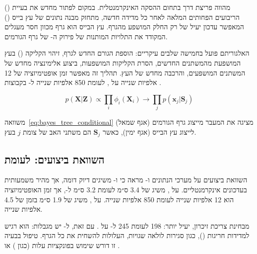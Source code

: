  ()
מהווה פריצת דרך בתחום ההסקה האינקרמנטלית. במקום לפתור מחדש את
בעיית הריבועים הפחותים המלאה לאחר כל מדידה חדשה, 
מתחזק מבנה נתונים של עץ בייס () המאפשר עדכון
יעיל של רק החלק המושפע מהגרף. עץ הבייס הוא גרף מכוון חסר
מעגלים המקודד את התלויות המותנות של פירוק ה- של גרף
הגורמים.

האלגוריתם פועל בחמישה שלבים עיקריים: הוספת הגורם החדש לגרף,
זיהוי הקליקה () בעץ המושפעת מהמשתנים החדשים,
הסרת הקליקות המושפעות, ביצוע אלימינציה מחדש של המשתנים
המושפעים, והרכבה מחדש של העץ. תהליך זה מאפשר זמן אופטימיזציה
של 12 אלפיות שנייה על , לעומת 850 אלפיות שנייה
ל- בקבוצות \cite{Thrun2005ProbRobotics}.

\begin{equation}
    p(\mathbf{X} | \mathbf{Z}) \propto \prod_{i} \phi_i(\mathbf{X}_i)
    \rightarrow \prod_{j} p(\mathbf{x}_j | \mathbf{S}_j)
    \label{eq:bayes_tree_conditional}
\end{equation}

משוואה~\ref{eq:bayes_tree_conditional} מציגה את המעבר מייצוג
גרף הגורמים (אגף שמאל) לייצוג עץ הבייס (אגף ימין), כאשר
$\mathbf{S}_j$ הם משתני האב של צומת $j$ בעץ.

\subsection{השוואת ביצועים:  לעומת }
\label{subsec:isam2_vs_g2o}

השוואת ביצועים על מערכי הנתונים  ו-
מראה כי  ו- משיגים דיוק דומה, אך 
מהיר משמעותית בעדכונים אינקרמנטליים. על , 
משיג  של 3.4 ס״מ לעומת 3.2 ס״מ ל-,
אך זמן האופטימיזציה הוא 12 אלפיות שנייה לעומת 850 אלפיות שנייה.
על ,  משיג  של 1.9 ס״מ
בזמן של 4.5 אלפיות שנייה.

מבחינת צריכת זיכרון,  יעיל יותר: 198  לעומת
245  ל- על . עם זאת, ל-
יש מגבלות: הוא רגיש למדידות חריגות (), כגון סגירות
לולאה שגויות, העלולות להשחית את כל הגרף. טיפול בבעיה זו דורש
שימוש בפונקציות עלות  (כגון ) או
 \cite{Grisetti2010g2o}.

